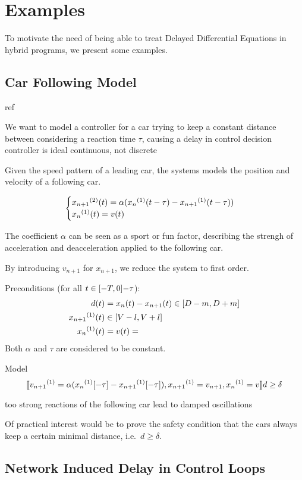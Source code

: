 \chapter{Examples}\label{sec:example-hp}

To motivate the need of being able to treat Delayed Differential Equations in hybrid programs, we present some examples.

\section{Car Following Model}

    ref

    We want to model a controller for a car
    trying to keep a constant distance between
    considering a reaction time $\tau$, causing a delay in control decision
    controller is ideal continuous, not discrete

    Given the speed pattern of a leading car, the systems models the position and velocity of a following car.

    \begin{equation*}
        \begin{cases}
            \D[2]{x_{n+1}}(t) = \alpha (\D{x_n}(t-\tau)-\D{x_{n+1}}(t-\tau))\\
            \D{x_n}(t) = v(t)
        \end{cases}
    \end{equation*}

    The coefficient $\alpha$ can be seen as a sport or fun factor, describing the strengh of acceleration and deacceleration applied to the following car.

    By introducing $v_{n+1}$ for $x_{n+1}$, we reduce the system to first order.

    Preconditions (for all $t\in[-T,0]{-\tau}$):
    \begin{align*}
        d(t) &= x_n(t)-x_{n+1}(t) \in\compactum{D-m}{D+m}\\
        \D{x_{n+1}}(t) &\in\compactum{V-l}{V+l}\\
        \D{x_n}(t) &= v(t) = 
    \end{align*}
    Both $\alpha$ and $\tau$ are considered to be constant.

    Model
    \begin{equation*}
        \dbox{\hevolve{
            \D{v_{n+1}} = \alpha(\D{x_n}[-\tau]-\D{x_{n+1}}[-\tau])\syssep
            \D{x_{n+1}} = v_{n+1}\syssep
            \D{x_n} = v
        }}{d\geq\delta}
    \end{equation*}

    too strong reactions of the following car lead to damped oscillations

    Of practical interest would be to prove the safety condition that the cars always keep a certain minimal distance, i.e.\ $d\geq\delta$.

\section{Network Induced Delay in Control Loops}